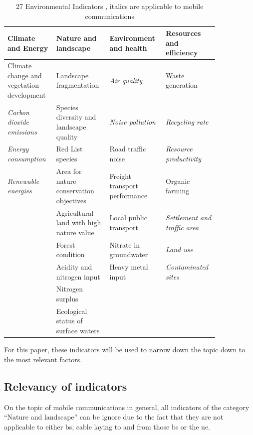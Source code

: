\documentclass[11pt,a4paper]{article}
\begin{document}
\begin{table}[t]
  \centering
  \begin{tabular}{p{0.21\linewidth}|p{0.21\linewidth}|p{0.21\linewidth}|p{0.21\linewidth}}
    \textbf{Climate and Energy} & \textbf{Nature and landscape} & \textbf{Environment and health} & \textbf{Resources and efficiency}\\
    \hline
    Climate change and vegetation development & Landscape fragmentation & \textit{Air quality} & Waste generation\\
    \hline
    \textit{Carbon dioxide emissions} & Species diversity and landscape quality & \textit{Noise pollution} & \textit{Recycling rate}\\
    \hline
    \textit{Energy consumption} & Red List species & Road traffic noise & \textit{Resource productivity}\\
    \hline
    \textit{Renewable energies} & Area for nature conservation objectives & Freight transport performance & Organic farming\\
    \hline
    & Agricultural land with high nature value & Local public transport & \textit{Settlement and traffic area}\\
    \hline
    & Forest condition & Nitrate in groundwater & \textit{Land use}\\
    \hline
    & Acidity and nitrogen input & Heavy metal input & \textit{Contaminated sites}\\
    \hline
    & Nitrogen surplus &\\
    \hline
    & Ecological status of surface waters &\\
  \end{tabular}
  \caption{27 Environmental Indicators \citep{Umweltindikatoren}, italics are applicable to mobile communications}
  \label{tab:indicators}
\end{table}

For this paper, these indicators will be used to narrow down the topic down to the most relevant factors.

\subsection{Relevancy of indicators}\label{subsec:relevancy}

On the topic of mobile communications in general, all indicators of the category \enquote{Nature and landscape} can be ignore due to the fact that they are not applicable to either \acrshort{bs}, cable laying to and from those \acrshort{bs} or the \acrshort{ue}.
\end{document}
